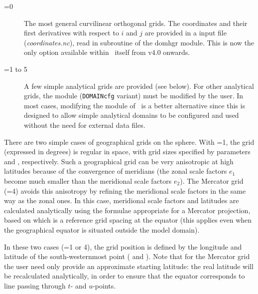 \documentclass[../main/NEMO_manual]{subfiles}
\begin{document}
\begin{description}
 \item [{=0}]  The most general curvilinear orthogonal grids.
  The coordinates and their first derivatives with respect to $i$ and $j$ are provided
  in a input file (\textit{coordinates.nc}), read in  subroutine of the domhgr module.
  This is now the only option available within \NEMO\ itself from v4.0 onwards.
\item [{=1 to 5}] A few simple analytical grids are provided (see below).
  For other analytical grids, the  module (\texttt{DOMAINcfg} variant) must be
  modified by the user. In most cases, modifying the  module of \NEMO\ is
  a better alternative since this is designed to allow simple analytical domains to be
  configured and used without the need for external data files.
\end{description}

There are two simple cases of geographical grids on the sphere. With
=1, the grid (expressed in degrees) is regular in space,
with grid sizes specified by parameters  and ,
respectively. Such a geographical grid can be very anisotropic at high latitudes
because of the convergence of meridians (the zonal scale factors $e_1$
become much smaller than the meridional scale factors $e_2$). The Mercator
grid (=4) avoids this anisotropy by refining the meridional scale
factors in the same way as the zonal ones. In this case, meridional scale factors
and latitudes are calculated analytically using the formulae appropriate for
a Mercator projection, based on  which is a reference grid spacing
at the equator (this applies even when the geographical equator is situated outside
the model domain).

In these two cases (=1 or 4), the grid position is defined by the
longitude and latitude of the south-westernmost point (
and ). Note that for the Mercator grid the user need only provide
an approximate starting latitude: the real latitude will be recalculated analytically,
in order to ensure that the equator corresponds to line passing through $t$-
and $u$-points.
\end{document}

